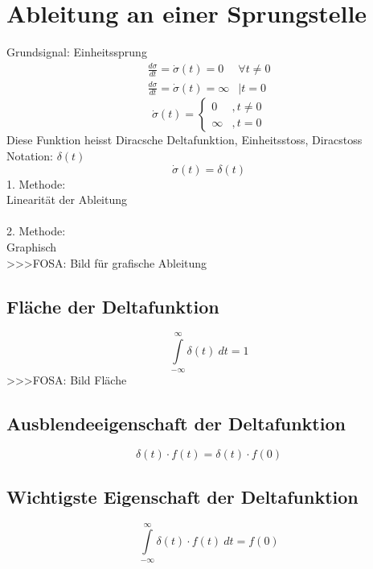 \section{Ableitung an einer Sprungstelle}
Grundsignal: Einheitssprung\\
\[ \boxed{\begin{array}{ll}
\frac{d \sigma}{d t} = \dot{\sigma}(t) = 0 & \forall t \neq 0 \\
\frac{d \sigma}{d t} = \dot{\sigma}(t) = \infty & | t =   0
\end{array}
} \]
\[ \boxed{\dot{\sigma}(t) = \left\lbrace 
\begin{array}{ll}0&, t \neq 0\\\infty&, t = 0\end{array} \right.} \]
Diese Funktion heisst Diracsche Deltafunktion, Einheitsstoss, Diracstoss\\
Notation: $\delta(t)$
\[ \boxed{\dot{\sigma}(t) = \delta(t)} \]
1. Methode: \\
Linearität der Ableitung\\\\
2. Methode: \\
Graphisch\\
>>>FOSA: Bild für grafische Ableitung\\

\subsection{Fläche der Deltafunktion}
\[ \boxed{\int\limits_{-\infty}^{\infty} \delta(t) ~ dt = 1} \]
>>>FOSA: Bild Fläche

\subsection{Ausblendeeigenschaft der Deltafunktion}
\[ \boxed{\delta(t) \cdot f(t) = \delta(t) \cdot f(0)} \]

\subsection{Wichtigste Eigenschaft der Deltafunktion}
\[ \boxed{\int\limits_{-\infty}^{\infty} \delta(t) \cdot f(t) ~ dt = f(0)} \]

